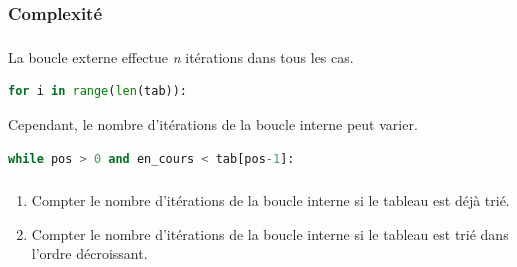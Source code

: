 \documentclass[svgnames,11pt]{beamer}
\begin{document}
\subsubsection{Complexité}
\begin{frame}[fragile]
    \frametitle{}

    La boucle externe effectue \emph{n} itérations dans tous les cas. 
\begin{center}
\begin{lstlisting}[language=Python, basicstyle=\small, xrightmargin=1em]
for i in range(len(tab)):
\end{lstlisting}
\end{center}
    Cependant, le nombre d'itérations de la boucle interne peut varier.
\begin{center}
\begin{lstlisting}[language=Python, basicstyle=\small, xrightmargin=1em]
while pos > 0 and en_cours < tab[pos-1]:
\end{lstlisting}
\end{center}
    \begin{center}
        \label{CODE}
        \end{center}
\end{frame}

\begin{frame}
    \frametitle{}

    \begin{activite}
        \begin{enumerate}
            \item Compter le nombre d'itérations de la boucle interne si le tableau est déjà trié.
            \item Compter le nombre d'itérations de la boucle interne si le tableau est trié dans l'ordre décroissant.
        \end{enumerate}
    \end{activite}

\end{frame}
\end{document}
